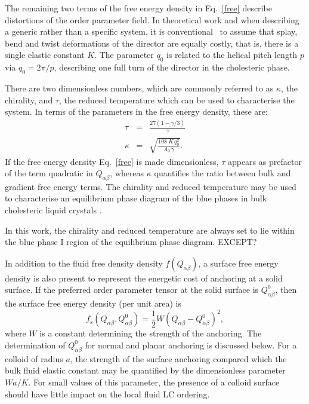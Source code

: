 \documentclass[12pt,twoside]{article}
\begin{document}
The remaining two terms of the free energy density in Eq.~\ref{free} describe
distortions of the order parameter field. In theoretical work and when
describing a generic rather than a specific system, it is 
conventional~\cite{blue1,deGennes} to
assume that splay, bend and twist deformations of the director are equally
costly, that is, there is a single elastic constant $K$. The parameter $q_0$
is related to the helical pitch length $p$ via $q_0=2\pi/p$,
describing one full turn of the director in the cholesteric phase.

There are two dimensionless numbers, which are commonly referred to as
$\kappa$, the chirality, and  $\tau$, the reduced temperature
\cite{blue1} which can be used to characterise the system. In terms of
the parameters in the free energy density, these are:
\begin{eqnarray}\label{cntrl-param} 
\tau&=&\frac{27(1-\gamma/3)}{\gamma}\label{tau}\\
\kappa&=&\sqrt{\frac{108\ K\, q_0^2}{A_0\, \gamma}}\label{kappa}.
\end{eqnarray}
If the free energy density Eq.~\ref{free} is made dimensionless, $\tau$
appears as prefactor of the term  quadratic in $Q_{\alpha\beta}$,
whereas $\kappa$
quantifies the ratio between bulk and  gradient free energy terms. The
chirality and reduced temperature may be used to characterise an equilibrium
phase diagram of the blue phases in bulk cholesteric liquid crystals
\cite{blue1,oliver1}.

In this work, the chirality and reduced temperature are always set to lie
within the blue phase I region of the equilibrium phase diagram. EXCEPT?

In addition to the fluid free density density $f(Q_{\alpha\beta})$, a surface
free energy density is also present to represent the energetic cost of
anchoring at a solid surface. If the preferred order parameter tensor
at the solid surface is $Q^0_{\alpha\beta}$, then the surface free energy
density (per unit area) is
\begin{equation}
f_s(Q_{\alpha\beta}, Q^0_{\alpha\beta})
= {\textstyle \frac{1}{2}}W(Q_{\alpha\beta} - Q^0_{\alpha\beta})^2,
\end{equation}
where $W$ is a constant determining the strength of the anchoring.
The determination of $Q^0_{\alpha\beta}$ for normal and planar anchoring is
discussed below. For a colloid of radius $a$, the strength of the surface
anchoring compared which the bulk fluid elastic constant may be quantified
by the dimensionless parameter $Wa/K$. For small values of this parameter,
the presence of a colloid surface should have little impact on the local
fluid LC ordering.
\end{document}
